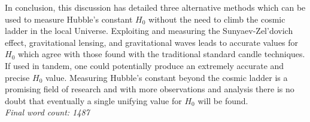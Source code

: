 \documentclass[12pt, onecolumn]{revtex4}    %
\begin{document}
In conclusion, this discussion has detailed three alternative methods which can be used to measure Hubble's constant $H_0$ without the need to climb the cosmic ladder in the local Universe. Exploiting and measuring the Sunyaev-Zel'dovich effect, gravitational lensing, and gravitational waves leads to accurate values for $H_0$ which agree with those found with the traditional standard candle techniques. If used in tandem, one could potentially produce an extremely accurate and precise $H_0$ value. Measuring Hubble's constant beyond the cosmic ladder is a promising field of research and with more observations and analysis there is no doubt that eventually a single unifying value for $H_0$ will be found. \\ 

\textit{Final word count: 1487}

\newpage





\newpage
\end{document}
